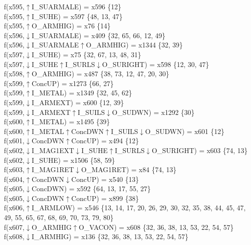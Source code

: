 f(x595,$\uparrow$I\_SUARMALE) = x596 \{12\} \\  
f(x595,$\uparrow$I\_SUHE) = x597 \{48, 13, 47\} \\  
f(x595,$\uparrow$O\_ARMHIG) = x76 \{14\} \\  
f(x596,$\downarrow$I\_SUARMALE) = x409 \{32, 65, 66, 12, 49\} \\  
f(x596,$\downarrow$I\_SUARMALE$\uparrow$O\_ARMHIG) = x1344 \{32, 39\} \\  
f(x597,$\downarrow$I\_SUHE) = x75 \{32, 67, 13, 48, 31\} \\  
f(x597,$\downarrow$I\_SUHE$\uparrow$I\_SURLS$\downarrow$O\_SURIGHT) = x598 \{12, 30, 47\} \\  
f(x598,$\uparrow$O\_ARMHIG) = x487 \{38, 73, 12, 47, 20, 30\} \\  
f(x599,$\uparrow$ConcUP) = x1273 \{66, 27\} \\  
f(x599,$\uparrow$I\_METAL) = x1349 \{32, 45, 62\} \\  
f(x599,$\downarrow$I\_ARMEXT) = x600 \{12, 39\} \\  
f(x599,$\downarrow$I\_ARMEXT$\uparrow$I\_SUILS$\downarrow$O\_SUDWN) = x1292 \{30\} \\  
f(x600,$\uparrow$I\_METAL) = x1495 \{39\} \\  
f(x600,$\uparrow$I\_METAL$\uparrow$ConcDWN$\uparrow$I\_SUILS$\downarrow$O\_SUDWN) = x601 \{12\} \\  
f(x601,$\downarrow$ConcDWN$\uparrow$ConcUP) = x494 \{12\} \\  
f(x602,$\downarrow$I\_MAG1EXT$\downarrow$I\_SUHE$\uparrow$I\_SURLS$\downarrow$O\_SURIGHT) = x603 \{74, 13\} \\  
f(x602,$\downarrow$I\_SUHE) = x1506 \{58, 59\} \\  
f(x603,$\uparrow$I\_MAG1RET$\downarrow$O\_MAG1RET) = x84 \{74, 13\} \\  
f(x604,$\uparrow$ConcDWN$\downarrow$ConcUP) = x540 \{13\} \\  
f(x605,$\downarrow$ConcDWN) = x592 \{64, 13, 17, 55, 27\} \\  
f(x605,$\downarrow$ConcDWN$\uparrow$ConcUP) = x899 \{38\} \\  
f(x606,$\uparrow$I\_ARMLOW) = x546 \{13, 14, 17, 20, 26, 29, 30, 32, 35, 38, 44, 45, 47, 49, 55, 65, 67, 68, 69, 70, 73, 79, 80\} \\  
f(x607,$\downarrow$O\_ARMHIG$\uparrow$O\_VACON) = x608 \{32, 36, 38, 13, 53, 22, 54, 57\} \\  
f(x608,$\downarrow$I\_ARMHIG) = x136 \{32, 36, 38, 13, 53, 22, 54, 57\} \\  
